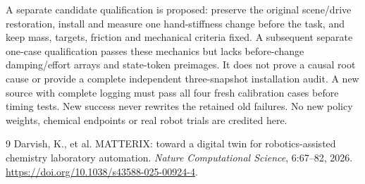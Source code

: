 \documentclass{article}
\begin{document}
A separate candidate qualification is proposed: preserve the original
scene/drive restoration, install and measure one hand-stiffness change
before the task, and keep mass, targets, friction and mechanical criteria
fixed. A subsequent separate one-case qualification passes these mechanics
but lacks before-change damping/effort arrays and state-token preimages.
It does not prove a causal root cause or provide a complete independent
three-snapshot installation audit. A new source with complete logging must
pass all four fresh calibration cases before timing tests.
New success never rewrites the retained old failures. No new policy
weights, chemical endpoints or real robot trials are credited here.

\begin{thebibliography}{9}
 Darvish, K., et al. MATTERIX: toward a digital twin for robotics-assisted chemistry laboratory automation. \emph{Nature Computational Science}, 6:67--82, 2026. \url{https://doi.org/10.1038/s43588-025-00924-4}.
\end{thebibliography}
\end{document}
